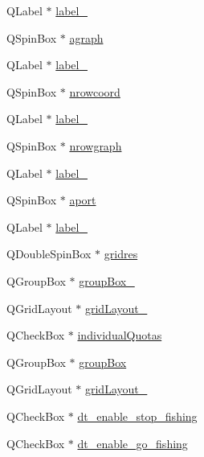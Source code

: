 \begin{DoxyCompactItemize}
Q\+Label $\ast$ \mbox{\hyperlink{class_ui___scenario_dialog_a1a50eb3f8491dea657615d40cca3025b}{label\+\_}}
\item 
Q\+Spin\+Box $\ast$ \mbox{\hyperlink{class_ui___scenario_dialog_a15291c13099b83016d598e5461be9bee}{agraph}}
\item 
Q\+Label $\ast$ \mbox{\hyperlink{class_ui___scenario_dialog_a4ba67ebb9490c4aca00c216542509893}{label\+\_}}
\item 
Q\+Spin\+Box $\ast$ \mbox{\hyperlink{class_ui___scenario_dialog_a089f48c2257832e21aac0d03cb1b8a24}{nrowcoord}}
\item 
Q\+Label $\ast$ \mbox{\hyperlink{class_ui___scenario_dialog_a43fcc3ee507d482ab06bbf36ac47d056}{label\+\_}}
\item 
Q\+Spin\+Box $\ast$ \mbox{\hyperlink{class_ui___scenario_dialog_a444a5395494095207465528a31c329f1}{nrowgraph}}
\item 
Q\+Label $\ast$ \mbox{\hyperlink{class_ui___scenario_dialog_ac90c66804073d2d590154872d5335314}{label\+\_}}
\item 
Q\+Spin\+Box $\ast$ \mbox{\hyperlink{class_ui___scenario_dialog_a31e808cbcb3e629357f86c369ce8a482}{aport}}
\item 
Q\+Label $\ast$ \mbox{\hyperlink{class_ui___scenario_dialog_a6e3707947741cff51a128040acbc75ca}{label\+\_}}
\item 
Q\+Double\+Spin\+Box $\ast$ \mbox{\hyperlink{class_ui___scenario_dialog_ac67cc5e3980b426664855b9212a95649}{gridres}}
\item 
Q\+Group\+Box $\ast$ \mbox{\hyperlink{class_ui___scenario_dialog_a0fff203b15fd3d1b1b11f24c87311e4f}{group\+Box\+\_}}
\item 
Q\+Grid\+Layout $\ast$ \mbox{\hyperlink{class_ui___scenario_dialog_a5659b97c16eead7feec16c5e1a63cdb8}{grid\+Layout\+\_}}
\item 
Q\+Check\+Box $\ast$ \mbox{\hyperlink{class_ui___scenario_dialog_abd0f9ed423ed8bd072c58e6299a86e35}{individual\+Quotas}}
\item 
Q\+Group\+Box $\ast$ \mbox{\hyperlink{class_ui___scenario_dialog_a3dbaab4a100dc46d1aaa298f55002869}{group\+Box}}
\item 
Q\+Grid\+Layout $\ast$ \mbox{\hyperlink{class_ui___scenario_dialog_a6d092f8f99f46c5603a55f3fafb1bae0}{grid\+Layout\+\_}}
\item 
Q\+Check\+Box $\ast$ \mbox{\hyperlink{class_ui___scenario_dialog_a9180cf331d89d987d24108683a752023}{dt\+\_\+enable\+\_\+stop\+\_\+fishing}}
\item 
Q\+Check\+Box $\ast$ \mbox{\hyperlink{class_ui___scenario_dialog_a8d6d3684f5921ce0603575275fbc6a13}{dt\+\_\+enable\+\_\+go\+\_\+fishing}}

\end{DoxyCompactItemize}
